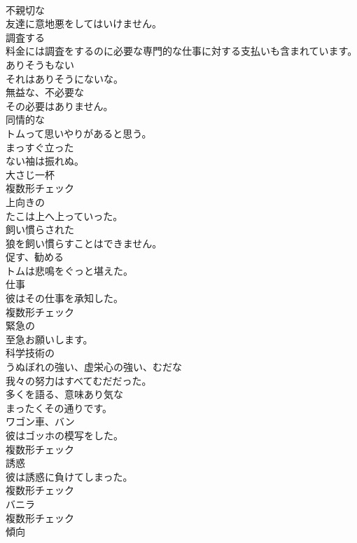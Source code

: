 \documentclass[8pt]{extreport}
\begin{document}
\begin{CJK}{UTF8}{min}
\\	[形容詞]	不親切な	
\\	友達に意地悪をしてはいけません。	
\\	[動詞]	調査する	
\\	料金には調査をするのに必要な専門的な仕事に対する支払いも含まれています。	
\\	[形容詞]	ありそうもない	
\\	それはありそうにないな。	
\\	[形容詞]	無益な、不必要な	
\\	その必要はありません。	
\\	[形容詞]	同情的な	
\\	トムって思いやりがあると思う。	
\\	[形容詞]	まっすぐ立った	
\\	ない袖は振れぬ。	
\\	[名詞]	大さじ一杯	
\\	複数形チェック
\\	[形容詞]	上向きの	
\\	たこは上へ上っていった。	
\\	[形容詞]	飼い慣らされた	
\\	狼を飼い慣らすことはできません。	
\\	[動詞]	促す、勧める	
\\	トムは悲鳴をぐっと堪えた。	
\\	[名詞]	仕事	
\\	彼はその仕事を承知した。	
\\	複数形チェック
\\	[形容詞]	緊急の	
\\	至急お願いします。	
\\	[形容詞]	科学技術の	
\\	[形容詞]	うぬぼれの強い、虚栄心の強い、むだな	
\\	我々の努力はすべてむだだった。	
\\	[形容詞]	多くを語る、意味あり気な	
\\	まったくその通りです。	
\\	[名詞]	ワゴン車、バン	
\\	彼はゴッホの模写をした。	
\\	複数形チェック
\\	[名詞]	誘惑	
\\	彼は誘惑に負けてしまった。	
\\	複数形チェック
\\	[名詞]	バニラ	
\\	複数形チェック
\\	[名詞]	傾向	

\end{CJK}
\end{document}
